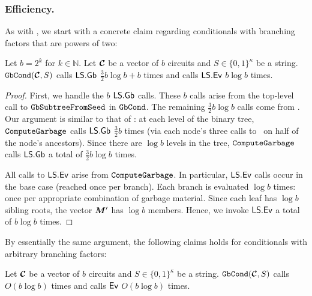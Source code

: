 \subsubsection{\gbcond Efficiency.}
As with \evcond, we start with a concrete claim
regarding conditionals with branching factors that are powers of two:

\begin{lemma}\label{lemma:gbcondtime}
  Let $b = 2^k$ for $k \in \mathbb{N}$.
  Let $\vec{\cir}$ be a vector of $b$ circuits and $S \in \{0,
  1\}^\kappa$ be a string.
  $\gbcond(\vec{\cir}, S)$ calls $\textsf{LS}.\textsf{Gb}$ $\frac{3}{2}b \log b + b$ times and calls
  $\textsf{LS}.\textsf{Ev}$ $b\log b$ times.
\end{lemma}
\begin{proof}
  First, we handle the $b$ $\textsf{LS}.\textsf{Gb}$ calls. These $b$ calls arise from the
  top-level call to $\mathtt{GbSubtreeFromSeed}$ in $\mathtt{GbCond}$.
  The remaining $\frac{3}{2} b \log b$ calls come from
  \computegarbage.
  Our argument is similar to that of :
  at each level of the binary tree, $\mathtt{ComputeGarbage}$ calls
  $\textsf{LS}.\textsf{Gb}$ $\frac{3}{2}b$ times (via each node's three calls to \gbtree\
  on half of the node's ancestors).
  Since there are $\log b$ levels in the tree, $\mathtt{ComputeGarbage}$ calls
  $\textsf{LS}.\textsf{Gb}$ a total of $\frac{3}{2}b \log b$ times.

  All calls to $\textsf{LS}.\textsf{Ev}$ arise from $\mathtt{ComputeGarbage}$.
  In particular, $\textsf{LS}.\textsf{Ev}$ calls occur in the base case (reached once per
  branch).
  Each branch is evaluated $\log b$ times: once per appropriate
  combination of garbage material. Since each leaf has $\log b$
  sibling roots, the vector $\vec{\mat}'$ has $\log b$ members.
  Hence, we invoke $\textsf{LS}.\textsf{Ev}$ a total of $b \log b$ times.
\end{proof}

By essentially the same argument, the following claims holds
for conditionals with arbitrary branching factors:
\begin{lemma}\label{lemma:gbcondtime-general}
  Let $\vec{\cir}$ be a vector of $b$ circuits and $S \in \{0,
  1\}^\kappa$ be a string.
  $\gbcond(\vec{\cir}, S)$ calls \gGb\ $O(b \log b)$ times and calls
  $\textsf{Ev}$ $O(b\log b)$ times.
\end{lemma}

